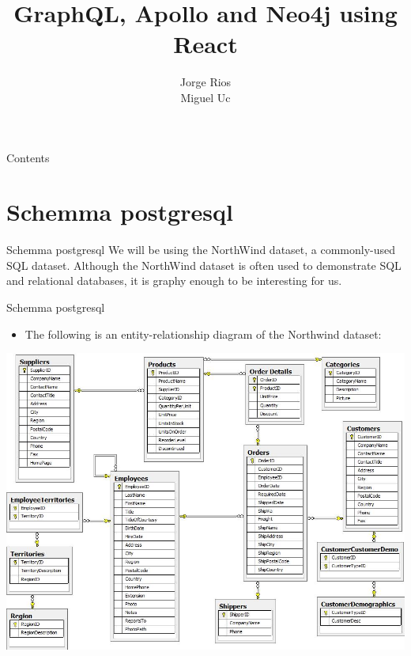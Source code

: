 \documentclass{beamer}
\title[Data Science]{GraphQL, Apollo and Neo4j using React}
\author[]{Jorge Rios\\Miguel Uc}
\institute[Ksquare Labs] %
{		
	\date{\today}
	
	
	
	}
\begin{document}
\begin{frame}
 \titlepage
\end{frame}

\begin{frame}{Contents}
	\tableofcontents
\end{frame}


\section{Schemma postgresql}
\begin{frame}{Schemma postgresql}{ }
We will be using the NorthWind dataset, a commonly-used SQL dataset. Although the NorthWind dataset is often used to demonstrate SQL and relational databases, it is graphy enough to be interesting for us. 

\end{frame}


\begin{frame}{Schemma postgresql}{ }
\begin{itemize}
	\item The following is an entity-relationship diagram of the Northwind dataset:
\end{itemize}	
\begin{center}
	\includegraphics[width=0.7\linewidth]{img/Northwind_diagram.jpg}
\end{center}
\end{frame}
\end{document}
